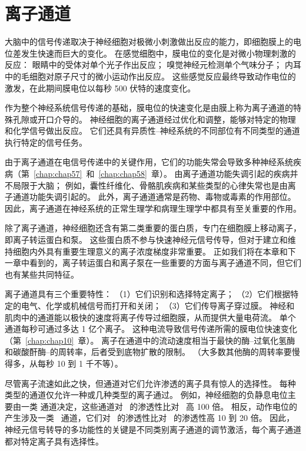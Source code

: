 \chapter{离子通道} \label{chap:chap8}

大脑中的信号传递取决于神经细胞对极微小刺激做出反应的能力，即细胞膜上的电位差发生快速而巨大的变化。
在感觉细胞中，膜电位的变化是对微小物理刺激的反应：
眼睛中的受体对单个光子作出反应；
嗅觉神经元检测单个气味分子；
内耳中的毛细胞对原子尺寸的微小运动作出反应。
这些感觉反应最终导致动作电位的激发，在此期间膜电位以每秒 500 伏特的速度变化。


作为整个神经系统信号传递的基础，膜电位的快速变化是由膜上称为离子通道的特殊孔隙或开口介导的。
神经细胞的离子通道经过优化和调整，能够对特定的物理和化学信号做出反应。
它们还具有异质性--神经系统的不同部位有不同类型的通道执行特定的信号任务。


由于离子通道在电信号传递中的关键作用，它们的功能失常会导致多种神经系统疾病（第~\ref{chap:chap57}~和~\ref{chap:chap58}~章）。
由离子通道功能失调引起的疾病并不局限于大脑；
例如，囊性纤维化、骨骼肌疾病和某些类型的心律失常也是由离子通道功能失调引起的。
此外，离子通道通常是药物、毒物或毒素的作用部位。
因此，离子通道在神经系统的正常生理学和病理生理学中都具有至关重要的作用。

除了离子通道，神经细胞还含有第二类重要的蛋白质，专门在细胞膜上移动离子，即离子转运蛋白和泵。
这些蛋白质不参与快速神经元信号传导，但对于建立和维持细胞内外具有重要生理意义的离子浓度梯度非常重要。
正如我们将在本章和下一章中看到的，离子转运蛋白和离子泵在一些重要的方面与离子通道不同，但它们也有某些共同特征。


离子通道具有三个重要特性：
（1）它们识别和选择特定离子；
（2）它们根据特定的电气、化学或机械信号而打开和关闭；
（3）它们传导离子穿过膜。
神经和肌肉中的通道能以极快的速度将离子传导过细胞膜，从而提供大量电荷流。
单个通道每秒可通过多达 1 亿个离子。
这种电流导致信号传递所需的膜电位快速变化（第~\ref{chap:chap10}~章）。
离子在通道中的流动速度相当于最快的酶--过氧化氢酶和碳酸酐酶--的周转率，后者受到底物扩散的限制。
（大多数其他酶的周转率要慢得多，从每秒 10 到 1 千不等）。


尽管离子流速如此之快，但通道对它们允许渗透的离子具有惊人的选择性。
每种类型的通道仅允许一种或几种类型的离子通过。
例如，神经细胞的负静息电位主要由一类  通道决定，这些通道对~ 的渗透性比对~ 高 100 倍。
相反，动作电位的产生涉及一类~ 通道，它们对~ 的渗透性比对~ 的渗透性高 10 到 20 倍。
因此，神经元信号转导的多功能性的关键是不同类别离子通道的调节激活，每个离子通道都对特定离子具有选择性。


